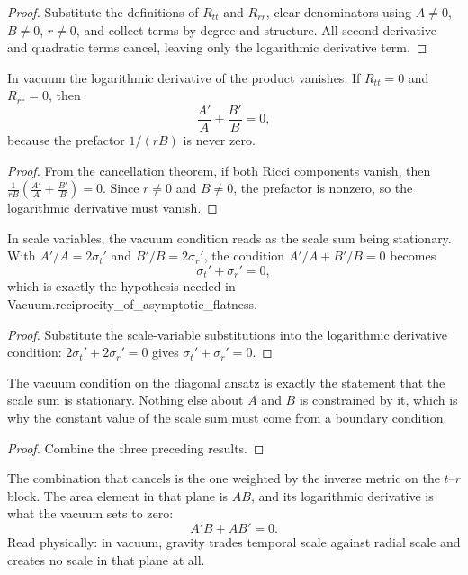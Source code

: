 \begin{proof}
Substitute the definitions of $R_{tt}$ and $R_{rr}$, clear denominators using $A \neq 0$, $B \neq 0$, $r \neq 0$, and collect terms by degree and structure. All second-derivative and quadratic terms cancel, leaving only the logarithmic derivative term.
\end{proof}

\begin{theorem}
In vacuum the logarithmic derivative of the product vanishes. If $R_{tt} = 0$ and $R_{rr} = 0$, then
$$\frac{A'}{A} + \frac{B'}{B} = 0,$$
because the prefactor $1/(rB)$ is never zero. 
\end{theorem}

\begin{proof}
From the cancellation theorem, if both Ricci components vanish, then $\frac{1}{rB}(\frac{A'}{A} + \frac{B'}{B}) = 0$. Since $r \neq 0$ and $B \neq 0$, the prefactor is nonzero, so the logarithmic derivative must vanish.
\end{proof}

\begin{theorem}
In scale variables, the vacuum condition reads as the scale sum being stationary. With $A' / A = 2\sigma_t'$ and $B' / B = 2\sigma_r'$, the condition $A'/A + B'/B = 0$ becomes
$$\sigma_t' + \sigma_r' = 0,$$
which is exactly the hypothesis needed in Vacuum.reciprocity\_of\_asymptotic\_flatness. 
\end{theorem}

\begin{proof}
Substitute the scale-variable substitutions into the logarithmic derivative condition: $2\sigma_t' + 2\sigma_r' = 0$ gives $\sigma_t' + \sigma_r' = 0$.
\end{proof}

\begin{theorem}
The vacuum condition on the diagonal ansatz is exactly the statement that the scale sum is stationary. Nothing else about $A$ and $B$ is constrained by it, which is why the constant value of the scale sum must come from a boundary condition. 
\end{theorem}

\begin{proof}
Combine the three preceding results.
\end{proof}

\begin{theorem}
The combination that cancels is the one weighted by the inverse metric on the $t$--$r$ block. The area element in that plane is $AB$, and its logarithmic derivative is what the vacuum sets to zero:
$$A' B + A B' = 0.$$
Read physically: in vacuum, gravity trades temporal scale against radial scale and creates no scale in that plane at all. 
\end{theorem}

